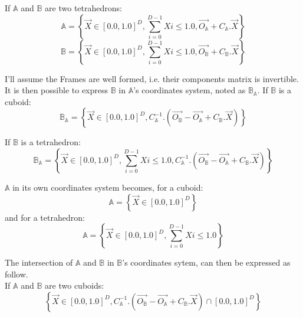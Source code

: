 \documentclass[12pt, a4paper]{article}
\begin{document}
If $\mathbb{A}$ and $\mathbb{B}$ are two tetrahedrons:
\begin{equation}
\mathbb{A}=\left\lbrace\overrightarrow{X}\in[0.0,1.0]^D,\sum_{i=0}^{D-1}Xi\le1.0,\overrightarrow{O_\mathbb{A}}+C_\mathbb{A}.\overrightarrow{X}\right\rbrace
\end{equation}
\begin{equation}
\mathbb{B}=\left\lbrace\overrightarrow{X}\in[0.0,1.0]^D,\sum_{i=0}^{D-1}Xi\le1.0,\overrightarrow{O_\mathbb{B}}+C_\mathbb{B}.\overrightarrow{X}\right\rbrace
\end{equation}

I'll assume the Frames are well formed, i.e. their components matrix is invertible. It is then possible to express $\mathbb{B}$ in $\mathbb{A}$'s coordinates system, noted as $\mathbb{B}_\mathbb{A}$. If $\mathbb{B}$ is a cuboid:
\begin{equation}
\mathbb{B}_\mathbb{A}=\left\lbrace\overrightarrow{X}\in[0.0,1.0]^D,C_\mathbb{A}^{-1}.(\overrightarrow{O_\mathbb{B}}-\overrightarrow{O_\mathbb{A}}+C_\mathbb{B}.\overrightarrow{X})\right\rbrace
\end{equation}

If $\mathbb{B}$ is a tetrahedron:
\begin{equation}
\mathbb{B}_\mathbb{A}=\left\lbrace\overrightarrow{X}\in[0.0,1.0]^D,\sum_{i=0}^{D-1}Xi\le1.0,C_\mathbb{A}^{-1}.(\overrightarrow{O_\mathbb{B}}-\overrightarrow{O_\mathbb{A}}+C_\mathbb{B}.\overrightarrow{X})\right\rbrace
\end{equation}

$\mathbb{A}$ in its own coordinates system becomes, for a cuboid:
\begin{equation}
\mathbb{A}=\left\lbrace\overrightarrow{X}\in[0.0,1.0]^D\right\rbrace
\end{equation}
and for a tetrahedron:
\begin{equation}
\mathbb{A}=\left\lbrace\overrightarrow{X}\in[0.0,1.0]^D,\sum_{i=0}^{D-1}Xi\le1.0\right\rbrace
\end{equation}

The intersection of $\mathbb{A}$ and $\mathbb{B}$ in $\mathbb{B}$'s coordinates sytem, can then be expressed as follow.\\

If $\mathbb{A}$ and $\mathbb{B}$ are two cuboids:
\begin{equation}
\left\lbrace\overrightarrow{X}\in[0.0,1.0]^D,C_\mathbb{A}^{-1}.(\overrightarrow{O_\mathbb{B}}-\overrightarrow{O_\mathbb{A}}+C_\mathbb{B}.\overrightarrow{X})\cap[0.0,1.0]^D\right\rbrace
\end{equation}
\end{document}
